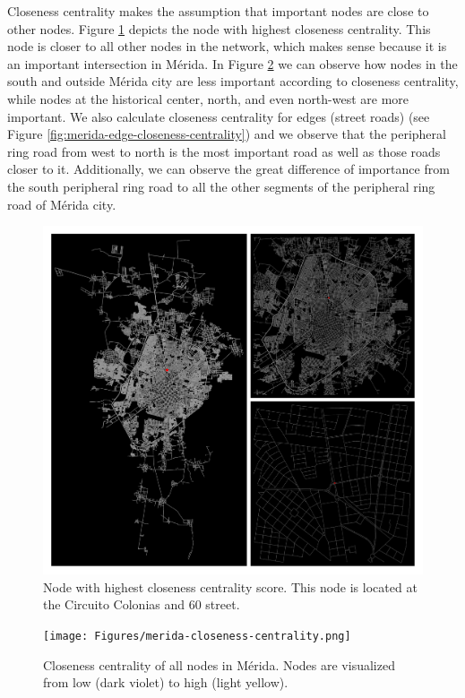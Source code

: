 Closeness centrality makes the assumption that important nodes are close to other nodes. Figure \ref{fig:merida-max-node-closeness-centrality} depicts the node with highest closeness centrality. This node is closer to all other nodes in the network, which makes sense because it is an important intersection in Mérida. In Figure \ref{fig:merida-closeness-centrality} we can observe how nodes in the south and outside Mérida city are less important according to closeness centrality, while nodes at the historical center, north, and even north-west are more important. We also calculate closeness centrality for edges (street roads) (see Figure \ref{fig:merida-edge-closeness-centrality}) and we observe that the peripheral ring road from west to north is the most important road as well as those roads closer to it. Additionally, we can observe the great difference of importance from the south peripheral ring road to all the other segments of the peripheral ring road of Mérida city.

\begin{figure}[htpb]
  \centering
  \includegraphics[width=1.0\textwidth]{Figures/merida-node-closeness-centrality.png}
  \caption{Node with highest closeness centrality score. This node is located at the Circuito Colonias and 60 street.
    \label{fig:merida-max-node-closeness-centrality}}
\end{figure}

\begin{figure}[htpb]
  \centering
  \texttt{[image: Figures/merida-closeness-centrality.png]}
  \caption{Closeness centrality of all nodes in Mérida. Nodes are visualized from low (dark violet) to high (light yellow).
    \label{fig:merida-closeness-centrality}}
\end{figure}


